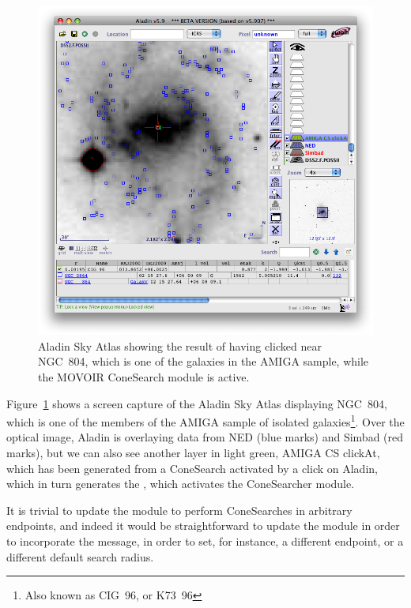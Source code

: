 			\begin{figure}[tbp]
				\centering
					\includegraphics[width=\textwidth]
					{fig/AladinAMIGAcone.png}
				\caption[Aladin showing the MOVOIR ConeSearch module]
				{Aladin Sky Atlas showing the result of having clicked
				near NGC~804, which is one of the galaxies in the
				AMIGA sample, while the MOVOIR ConeSearch module is
				active.}
				\label{fig:fig_AladinAMIGAcone}
			\end{figure}
			
			Figure~\ref{fig:fig_AladinAMIGAcone} shows a screen
			capture of the Aladin Sky Atlas displaying NGC~804, which
			is one of the members of the AMIGA sample of isolated
			galaxies\footnote{Also known as CIG~96, or K73~96}.
			Over the optical image, Aladin is overlaying data from NED
			(blue marks) and Simbad (red marks), but we can also see
			another layer in light green, AMIGA CS clickAt, which has
			been generated from a ConeSearch activated by a click on
			Aladin, which in turn generates the
			, which activates the
			ConeSearcher module.
			
			It is trivial to update the module to perform ConeSearches
			in arbitrary endpoints, and indeed it would be
			straightforward to update the module in order to
			incorporate the 
			message, in order to set, for instance, a different
			endpoint, or a different default search radius.
			

